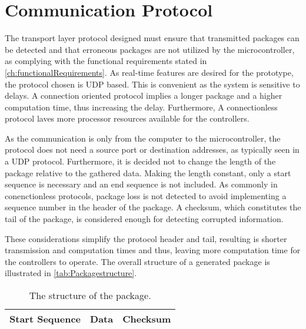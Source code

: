 \section{Communication Protocol}
The transport layer protocol designed must ensure that transmitted packages can be detected and that erroneous packages are not utilized by the microcontroller, as complying with the functional requirements stated in \autoref{ch:functionalRequirements}.
%
As real-time features are desired for the prototype, the protocol chosen is UDP based. This is convenient as the system is sensitive to delays. A connection oriented protocol implies a longer package and a higher computation time, thus increasing the delay. Furthermore, A connectionless protocol laves more processor resources available for the controllers.

As the communication is only from the computer to the microcontroller, the protocol does not need a source port or destination addresses, as typically seen in a UDP protocol. Furthermore, it is decided not to change the length of the package relative to the gathered data. Making the length constant, only a start sequence is necessary and an end sequence is not included. As commonly in conenctionless protocols, package loss is not detected to avoid implementing a sequence number in the header of the package. A checksum, which constitutes the tail of the package, is considered enough for detecting corrupted information. 

These considerations simplify the protocol header and tail, resulting is shorter transmission and computation times and thus, leaving more computation time for the controllers to operate. The overall structure of a generated package is illustrated in \autoref{tab:Packagestructure}.
\begin{table}[H]\centering
\begin{tabular}{|>{\centering\arraybackslash}m{3cm}|>{\centering\arraybackslash}m{2cm}|>{\centering\arraybackslash}m{2cm}|}
\hline
Start Sequence & Data & Checksum \\
\hline
\end{tabular}
\caption{The structure of the package.}
\label{tab:Packagestructure}
\end{table}

